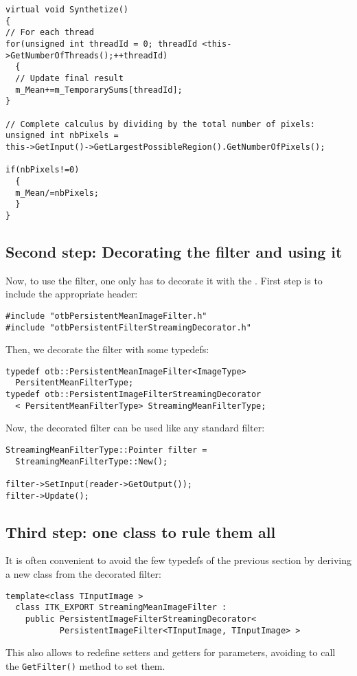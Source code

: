\begin{lstlisting}
virtual void Synthetize()
{
// For each thread
for(unsigned int threadId = 0; threadId <this->GetNumberOfThreads();++threadId)
  {
  // Update final result
  m_Mean+=m_TemporarySums[threadId];
} 

// Complete calculus by dividing by the total number of pixels:
unsigned int nbPixels =
this->GetInput()->GetLargestPossibleRegion().GetNumberOfPixels();

if(nbPixels!=0)
  {
  m_Mean/=nbPixels;
  }  
}
\end{lstlisting}

\subsection{Second step: Decorating the filter and using it}

Now, to use the filter, one only has to decorate it with the
. First step is
to include the appropriate header:

\begin{lstlisting}
#include "otbPersistentMeanImageFilter.h"
#include "otbPersistentFilterStreamingDecorator.h"
\end{lstlisting}

Then, we decorate the filter with some typedefs:

\begin{lstlisting}
typedef otb::PersistentMeanImageFilter<ImageType>
  PersitentMeanFilterType;
typedef otb::PersistentImageFilterStreamingDecorator
  < PersitentMeanFilterType> StreamingMeanFilterType;
\end{lstlisting}

Now, the decorated filter can be used like any standard filter:

\begin{lstlisting}
StreamingMeanFilterType::Pointer filter =
  StreamingMeanFilterType::New();

filter->SetInput(reader->GetOutput());
filter->Update();
\end{lstlisting}

\subsection{Third step: one class to rule them all}

It is often convenient to avoid the few typedefs of the previous
section by deriving a new class from the decorated filter:

\begin{lstlisting}
template<class TInputImage >
  class ITK_EXPORT StreamingMeanImageFilter :
    public PersistentImageFilterStreamingDecorator<
           PersistentImageFilter<TInputImage, TInputImage> >
\end{lstlisting}

This also allows to redefine setters and getters for parameters,
avoiding to call the \verb?GetFilter()? method to set them.
